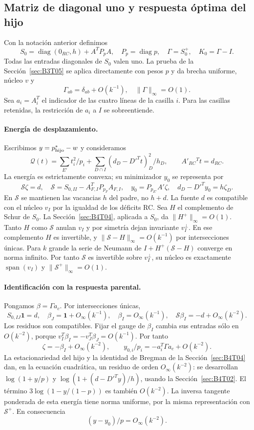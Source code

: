 \subsection{Matriz de diagonal uno y respuesta óptima del hijo}\label{sec:B4T06}
Con la notación anterior definimos
\[
 S_0=\operatorname{diag}(0_{RC},h)+A^TP_pA,\quad
 P_p=\operatorname{diag}p,\quad \Gamma=S_0^+,\quad K_0=\Gamma-I.
\]
Todas las entradas diagonales de $S_0$ valen uno. La prueba de la Sección~\ref{sec:B3T05}
se aplica directamente con pesos $p$ y da brecha uniforme, núcleo $v$ y
\[
 \Gamma_{ab}=\delta_{ab}+O(k^{-1}),\quad \|\Gamma\|_\infty=O(1).
\]
Sea $a_i=A_i^T$ el indicador de las cuatro líneas de la casilla $i$.
Para las casillas retenidas, la restricción de $a_i$ a $I$ se sobreentiende.

\paragraph{Energía de desplazamiento.}
Escribimos $y=p^*_{\rm hijo}-w$ y consideramos
\[
 \mathcal Q(t)=\sum_{E'}t_i^2/p_i+
 \sum_{D\cap I}(d_D-D'^Tt)_D^2/h_D,
 \qquad A'_{RC}{}^Tt=d_{RC}.
\]
La energía es estrictamente convexa; su minimizador $y_0$ se representa por
\[
 \mathcal S\zeta=d,\quad
 \mathcal S=S_{0,II}-A_{F,I}^TP_{p_F}A_{F,I},\quad
 y_0=P_{p_{E'}}A'\zeta,\quad d_D-D'^Ty_0=h\zeta_D.
\]
En $\mathcal S$ se mantienen las vacancias $h$ del padre, no $h+d$.
La fuente $d$ es compatible con el núcleo $v_I$ por la igualdad de los déficits RC.
Sea $H$ el complemento de Schur de $S_0$. La Sección~\ref{sec:B4T04}, aplicada a $S_0$, da
$\|H^+\|_\infty=O(1)$.
Tanto $H$ como $\mathcal S$ anulan $v_I$ y por simetría dejan invariante $v_I^\perp$.
En ese complemento $H$ es invertible, y $\|\mathcal S-H\|_\infty=O(k^{-1})$ por intersecciones únicas.
Para $k$ grande la serie de Neumann de $I+H^+(\mathcal S-H)$ converge en norma infinito.
Por tanto $\mathcal S$ es invertible sobre $v_I^\perp$, su núcleo es exactamente
$\operatorname{span}(v_I)$ y $\|\mathcal S^+\|_\infty=O(1)$.

\paragraph{Identificación con la respuesta parental.}
Pongamos $\beta=\Gamma a_c$. Por intersecciones únicas,
\[
 S_{0,IJ}\mathbf1=d,\quad \beta_J=\mathbf1+O_\infty(k^{-1}),
 \quad \beta_I=O_\infty(k^{-1}),\quad
 \mathcal S\beta_I=-d+O_\infty(k^{-2}).
\]
Los residuos son compatibles. Fijar el gauge de $\beta_I$ cambia sus
entradas sólo en $O(k^{-2})$, porque
$v_I^T\beta_I=-v_J^T\beta_J=O(k^{-1})$.
Por tanto
\[
 \zeta=-\beta_I+O_\infty(k^{-2}),\qquad
 \boxed{y_{0,i}/p_i=-a_i^T\Gamma a_c+O(k^{-2}).}
\]
La estacionariedad del hijo y la identidad de Bregman de la Sección~\ref{sec:B4T04} dan,
en la ecuación cuadrática, un residuo de orden $O_\infty(k^{-2})$:
se desarrollan $\log(1+y/p)$ y $\log(1+(d-D'^Ty)/h)$, usando la Sección~\ref{sec:B4T02}.
El término $3\log(1-y/(1-p))$ es también $O(k^{-2})$.
La inversa tangente ponderada de esta energía tiene norma uniforme,
por la misma representación con $\mathcal S^+$.
En consecuencia
\[
 \boxed{(y-y_0)/p=O_\infty(k^{-2}).}
\]

